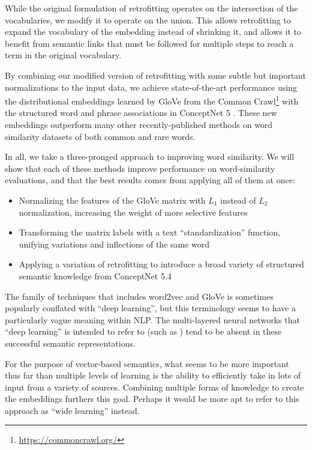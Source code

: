 \documentclass[letterpaper]{article}
\begin{document}
While the original formulation of retrofitting operates on the intersection of
the vocabularies, we modify it to operate on the union. This allows retrofitting
to expand the vocabulary of the embedding instead of shrinking it, and allows it
to benefit from semantic links that must be followed for multiple steps to reach
a term in the original vocabulary.

By combining our modified version of retrofitting with some subtle but important
normalizations to the input data, we achieve state-of-the-art performance using
the distributional embeddings learned by GloVe \cite{pennington2014glove} from
the Common Crawl\footnote{\url{https://commoncrawl.org/}} with the structured word and phrase
associations in ConceptNet 5 \cite{speer2012conceptnet}. These new embeddings
outperform many other recently-published methods on word similarity datasets of
both common and rare words.

In all, we take a three-pronged approach to improving word similarity. We will
show that each of these methods improve performance on word-similarity
evaluations, and that the best results comes from
applying all of them at once:

\begin{itemize}
\item Normalizing the features of the GloVe matrix with $L_1$ instead of $L_2$
    normalization, increasing the weight of more selective features
\item Transforming the matrix labels with a text ``standardization'' function,
    unifying variations and inflections of the same word
\item Applying a variation of retrofitting to introduce a broad variety of
    structured semantic knowledge from ConceptNet 5.4
\end{itemize}

The family of techniques that includes word2vec and GloVe is sometimes
popularly conflated with ``deep learning'', but this terminology seems to have
a particularly vague meaning within NLP. The multi-layered neural networks that
``deep learning'' is intended to refer to (such as )
tend to be absent in these successful semantic representations.

For the purpose of vector-based semantics, what seems to be more important thus
far than multiple levels of learning is the ability to efficiently take in lots
of input from a variety of sources. Combining multiple forms of knowledge to
create the embeddings furthers this goal. Perhaps it would be more apt to refer
to this approach as ``wide learning'' instead.
\end{document}
